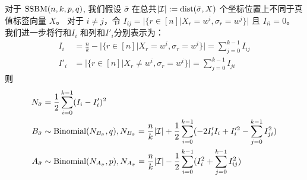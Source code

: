 \begin{lemma}\label{lem:minus}
	对于 $\operatorname{SSBM}(n,k,p,q)$,
  我们假设 $\bar{\sigma}$ 
  在总共$|\mathcal{I}|:=\operatorname{dist}(\bar{\sigma}, X)$ 
  个坐标位置上不同于真值标签向量
  $X$。
	对于 $i\neq j$，令 $I_{ij} = \Big|\{r\in [n] \big| X_r = w^i, \sigma_r = w^j \}\Big|$
  且 $I_{ii} = 0$。
  我们进一步将行和$I_i$
  和列和$I'_i$分别表示为：
  \begin{align}
  I_i &= \frac{n}{k} -
  \Big|\{r\in [n] \big| X_r = w^i, \sigma_r=w^i \}\Big|
  =
  \sum_{j=0}^{k-1} I_{ij} \label{eq:I_i_horizontal} \\
  I'_i &=
  \Big|\{r\in [n] \big| X_r \neq w^i,
  \sigma_r=w^i \}\Big|
  =\sum_{j=0}^{k-1} I_{ji}\label{eq:I_prime_i_vertical}
  \end{align}
	则
\begin{align}
	N_{\bar{\sigma}} &= \frac{1}{2}\sum_{i=0}^{k-1} (I_i - I_i')^2 \label{eq:N_w} \\
	B_{\bar{\sigma}} & \sim \textrm{Binomial}(N_{B_{\bar{\sigma}}} , q),
  N_{B_{\bar{\sigma}}}=\frac{n}{k}|\mathcal{I}| + \frac{1}{2}\sum_{i=0}^{k-1}  (-2 I'_i I_i  + I'^2_i - \sum_{j=0}^{k-1} I^2_{ji})
  \label{eq:B_w}\\
	A_{\bar{\sigma}} &
  \sim \textrm{Binomial}(N_{A_{\bar{\sigma}}}, p),
  N_{A_{\bar{\sigma}}}=
  \frac{n}{k}|\mathcal{I}| - \frac{1}{2}\sum_{i=0}^{k-1}
   (I^2_i + \sum_{j=0}^{k-1} I^2_{ij})
  \label{eq:A_w}
	\end{align}
\end{lemma}
